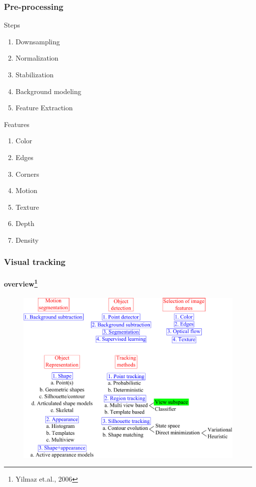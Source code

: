 \begin{frame}
\frametitle{Pre-processing}
\logoCSIPCPL\mypagenum
	{\color{red}Steps}
	\begin{enumerate}
		\item Downsampling
		\item Normalization
		\item Stabilization
		\item Background modeling
		\item Feature Extraction
	\end{enumerate}
	\vspace{0.1in}
	{\color{red}Features}
	\begin{enumerate}
		\item Color
		\item Edges
		\item Corners
		\item Motion
		\item Texture
		\item Depth
		\item Density
	\end{enumerate}
\end{frame}




\begin{frame}[plain]
\frametitle{Visual tracking}
\framesubtitle{overview\tiny{\footnote {Yilmaz et.al., 2006}}}
\logoCSIPCPL\mypagenum
\begin{changemargin}{-1.3in}{0in}
\begin{figure}
\includegraphics[width=1.1\textwidth]{thesis/TRK_overview.pdf}
\end{figure}	
\end{changemargin}
\end{frame}




